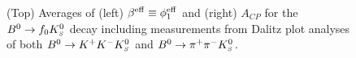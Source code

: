 \begin{figure}[htb]
  \begin{center}
    \hfill
  \end{center}
  \vspace{-0.8cm}
  \caption{
    (Top)
    Averages of 
    (left) $\beta^{\rm eff} \equiv \phi_1^{\rm eff}$ and (right) $A_{CP}$
    for the $B^0\to f_0K^0_{\scriptscriptstyle S}$ decay including measurements from Dalitz plot analyses of both $B^0\to K^+K^-K^0_{\scriptscriptstyle S}$ and $B^0\to \pi^+\pi^-K^0_{\scriptscriptstyle S}$.
  }
  \label{fig:cp_uta:qqs:f0KS}
\end{figure}

